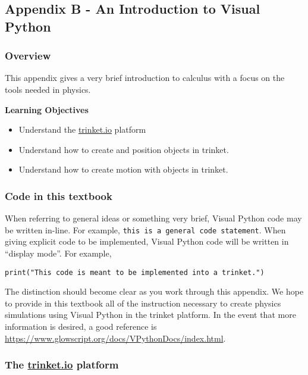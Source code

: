 \subsection{Appendix B - An Introduction to Visual Python}

\subsubsection{Overview}\label{app:visualpython}

This appendix gives a very brief introduction to calculus with a focus on the tools needed in physics.

\begin{framed}
\textbf{Learning Objectives}\\
\begin{itemize}
\item Understand the \href{http://trinket.io}{trinket.io} platform
\item Understand how to create and position objects in trinket.
\item Understand how to create motion with objects in trinket.
\end{itemize}
\end{framed}

\subsubsection{Code in this textbook}

When referring to general ideas or something very brief, Visual Python code may be written in-line. For example, \texttt{this is a general code statement}. When giving explicit code to be implemented, Visual Python code will be written in ``display mode''. For example,

\begin{verbatim}
print("This code is meant to be implemented into a trinket.")
\end{verbatim}

The distinction should become clear as you work through this appendix. We hope to provide in this textbook all of the instruction necessary to create physics simulations using Visual Python in the trinket platform. In the event that more information is desired, a good reference is \href{https://www.glowscript.org/docs/VPythonDocs/index.html}{https://www.glowscript.org/docs/VPythonDocs/index.html}.

\subsubsection{The \href{http://trinket.io}{trinket.io} platform}

